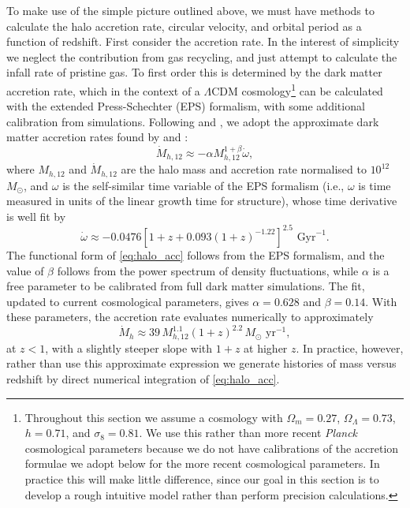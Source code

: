 \documentclass[useAMS,usenatbib]{mn2e}
\begin{document}
To make use of the simple picture outlined above, we must have methods to calculate the halo accretion rate, circular velocity, and orbital period as a function of redshift. First consider the accretion rate. In the interest of simplicity we neglect the contribution from gas recycling, and just attempt to calculate the infall rate of pristine gas. To first order this is determined by the dark matter accretion rate, which in the context of a $\Lambda$CDM cosmology\footnote{Throughout this section we assume a cosmology with $\Omega_m = 0.27$, $\Omega_\Lambda = 0.73$, $h=0.71$, and $\sigma_8 = 0.81$. We use this rather than more recent \textit{Planck} cosmological parameters because we do not have calibrations of the accretion formulae we adopt below for the more recent cosmological parameters. In practice this will make little difference, since our goal in this section is to develop a rough intuitive model rather than perform precision calculations.} can be calculated with the extended Press-Schechter (EPS) formalism, with some additional calibration from simulations. Following \citet{krumholz12d} and \citet{forbes14a}, we adopt the approximate dark matter accretion rates found by \citet{neistein08a} and \citet{bouche10a}:
\begin{equation}
\label{eq:halo_acc}
\dot{M}_{h,12} \approx -\alpha M_{h,12}^{1+\beta} \dot{\omega},
\end{equation}
where $M_{h,12}$ and $\dot{M}_{h,12}$ are the halo mass and accretion rate normalised to $10^{12}$ $M_\odot$, and $\omega$ is the self-similar time variable of the EPS formalism (i.e., $\omega$ is time measured in units of the linear growth time for structure), whose time derivative is well fit by
\begin{equation}
\dot{\omega} \approx -0.0476[1 + z + 0.093(1+z)^{-1.22}]^{2.5}\mbox{ Gyr}^{-1}.
\end{equation}
The functional form of \autoref{eq:halo_acc} follows from the EPS formalism, and the value of $\beta$ follows from the power spectrum of density fluctuations, while $\alpha$ is a free parameter to be calibrated from full dark matter simulations. The \citet{neistein08a} fit, updated to current cosmological parameters, gives $\alpha = 0.628$ and $\beta=0.14$. With these parameters, the accretion rate evaluates numerically to approximately
\begin{equation}
\dot{M}_{h} \approx 39 \, M_{h,12}^{1.1} \left(1+z\right)^{2.2}\,M_\odot\mbox{ yr}^{-1},
\end{equation}
at $z < 1$, with a slightly steeper slope with $1+z$ at higher $z$. In practice, however, rather than use this approximate expression we generate histories of mass versus redshift by direct numerical integration of \autoref{eq:halo_acc}. 
\end{document}
